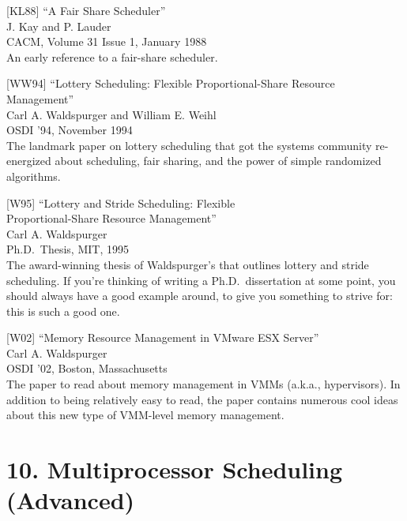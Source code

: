 {[}KL88{]} ``A Fair Share Scheduler''\\
J. Kay and P. Lauder\\
CACM, Volume 31 Issue 1, January 1988\\
An early reference to a fair-share scheduler.

{[}WW94{]} ``Lottery Scheduling: Flexible Proportional-Share Resource
Management''\\
Carl A. Waldspurger and William E. Weihl\\
OSDI '94, November 1994\\
The landmark paper on lottery scheduling that got the systems community
re-energized about scheduling, fair sharing, and the power of simple
randomized algorithms.

{[}W95{]} ``Lottery and Stride Scheduling: Flexible\\
Proportional-Share Resource Management''\\
Carl A. Waldspurger\\
Ph.D.~Thesis, MIT, 1995\\
The award-winning thesis of Waldspurger's that outlines lottery and
stride scheduling. If you're thinking of writing a Ph.D.~dissertation at
some point, you should always have a good example around, to give you
something to strive for: this is such a good one.

{[}W02{]} ``Memory Resource Management in VMware ESX Server''\\
Carl A. Waldspurger\\
OSDI '02, Boston, Massachusetts\\
The paper to read about memory management in VMMs (a.k.a., hypervisors).
In addition to being relatively easy to read, the paper contains
numerous cool ideas about this new type of VMM-level memory management.

\newpage

\hypertarget{multiprocessor-scheduling-advanced}{%
\section*{10. Multiprocessor Scheduling
(Advanced)}\label{multiprocessor-scheduling-advanced}}

